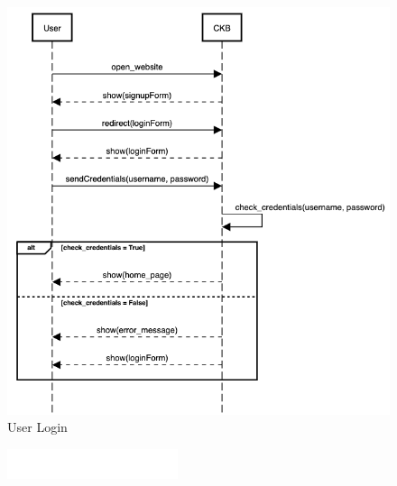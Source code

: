 \documentclass{article}
\begin{document}
            \begin{figure}[!ht]
                \centering
                \includegraphics[width=16cm]{LaudiziMarusicMassarelli/RASD/LoginSD.png}
                \caption{User Login}
                \label{fig:login}
            \end{figure}

            \begin{figure}[!ht]
                \centering
                \includegraphics[width=5cm]{LaudiziMarusicMassarelli/RASD/white.jpg}
                \label{fig:white}
            \end{figure}
        
\end{document}
